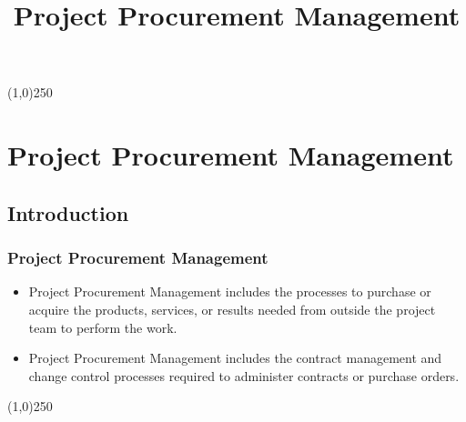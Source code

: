 



\title[Project Management]{Project Procurement Management}




%
\usetikzlibrary{arrows}

\tableofcontents
\newpage



\begin{frame}
\titlepage
\end{frame}\begin{center}\line(1,0){250}\end{center}
%
%








\section{Project Procurement Management}

\subsection{Introduction}


\begin{frame}
\frametitle{Project Procurement Management}
\begin{itemize}
	\item Project Procurement Management includes the processes to purchase or acquire the products, services, or results needed from outside the project team to perform the work.
	\item Project Procurement Management includes the contract management and change control processes required to administer contracts or purchase orders.
\end{itemize}
\end{frame}\begin{center}\line(1,0){250}\end{center}



